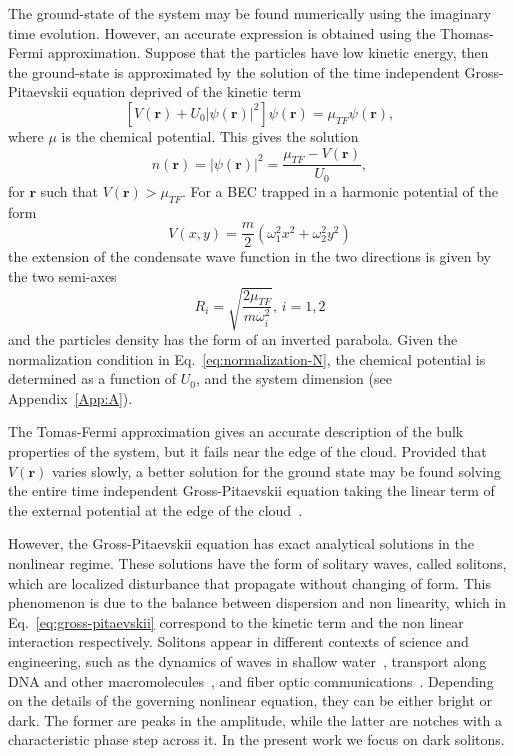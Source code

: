 The ground-state of the system may be found numerically using the imaginary time evolution. However, an accurate expression is obtained using the Thomas-Fermi approximation. Suppose that the particles have low kinetic energy, then the ground-state is approximated by the solution of the time independent Gross-Pitaevskii equation deprived of the kinetic term
\begin{equation}
\left[ V(\textbf{r}) + U_0 |\psi(\textbf{r})|^2 \right] \psi(\textbf{r}) = \mu_{TF} \psi(\textbf{r}),
\end{equation}
where $\mu$ is the chemical potential. This gives the solution
\begin{equation}
n(\textbf{r}) = |\psi(\textbf{r})|^2 = \frac{\mu_{TF} - V(\textbf{r})}{U_0},
\end{equation}
for $\textbf{r}$ such that $V(\textbf{r}) > \mu_{TF}$. 
For a BEC trapped in a harmonic potential of the form
\begin{equation}
V(x,y) = \frac{m}{2} (\omega_1^2 x^2 + \omega_2^2 y^2)
\end{equation}
the extension of the condensate wave function in the two directions is given by the two semi-axes
\begin{equation} \label{eq:TF-radius}
R_i = \sqrt{\frac{2\mu_{TF}}{m\omega_i^2}}, \, i = 1,2
\end{equation}
and the particles density has the form of an inverted parabola. Given the normalization condition in Eq.~\eqref{eq:normalization-N}, the chemical potential is determined as a function of $U_0$, and the system dimension (see Appendix~\ref{App:A}).

The Tomas-Fermi approximation gives an accurate description of the bulk properties of the system, but it fails near the edge of the cloud. Provided that $V(\textbf{r})$ varies slowly, a better solution for the ground state may be found solving the entire time independent Gross-Pitaevskii equation taking the linear term of the external potential at the edge of the cloud~\citep{pethick2002bose}.

However, the Gross-Pitaevskii equation has exact analytical solutions in the nonlinear regime. These solutions have the form of solitary waves, called solitons, which are localized disturbance that propagate without changing of form. This phenomenon is due to the balance between dispersion and non linearity, which in Eq.~\eqref{eq:gross-pitaevskii} correspond to the kinetic term and the non linear interaction respectively. Solitons appear in different contexts of science and engineering, such as the dynamics of waves in shallow water~\citep{B88}, transport along DNA and other macromolecules~\citep{P95}, and fiber optic communications~\citep{H90}.
Depending on the details of the governing nonlinear equation, they can be either bright or dark. The former are peaks in the amplitude, while the latter are notches with a characteristic phase step across it. In the present work we focus on dark solitons. 

